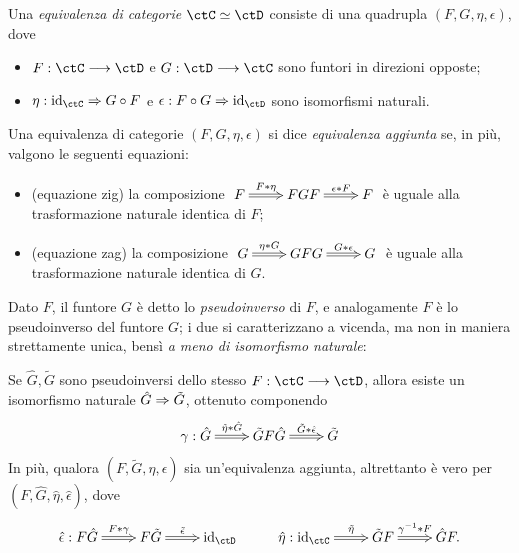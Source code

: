 \begin{definition}\label{funtore_equcat}
	Una \emph{equivalenza di categorie} \(\ctC\simeq\ctD\) consiste di una quadrupla \((F,G,\eta,\epsilon)\), dove
	\begin{itemize}
		\item \(F : \ctC\fun\ctD\) e \(G : \ctD\fun\ctC\) sono funtori in direzioni opposte;
		\item \(\eta : \Id[\ctC] \nat G\cmp F\) e \(\epsilon : F\cmp G \nat \Id[\ctD]\) sono isomorfismi naturali.
	\end{itemize}
	Una equivalenza di categorie \((F,G,\eta,\epsilon)\) si dice \emph{equivalenza aggiunta} se, in più, valgono le seguenti equazioni:
	\begin{itemize}
		\item (equazione zig) la composizione \(\xymatrix{F \ar@{=>}[r]^-{F\whi\eta} & FGF \ar@{=>}[r]^-{\epsilon\whi F} & F}\) è uguale alla trasformazione naturale identica di \(F\);
		\item (equazione zag) la composizione \(\xymatrix{G \ar@{=>}[r]^-{\eta\whi G} & GFG \ar@{=>}[r]^-{G\whi\epsilon} & G}\) è uguale alla trasformazione naturale identica di \(G\).
	\end{itemize}
	Dato \(F\), il funtore \(G\) è detto lo \emph{pseudoinverso} di \(F\), e analogamente \(F\) è lo pseudoinverso del funtore \(G\); i due si caratterizzano a vicenda, ma non in maniera strettamente unica, bensì \emph{a meno di isomorfismo naturale}:
	\begin{lemma}
		Se \(\hat G,\tilde G\) sono pseudoinversi dello stesso \(F : \ctC\fun\ctD\), allora esiste un isomorfismo naturale \(\hat G\Rightarrow \tilde G\), ottenuto componendo
		\[\xymatrix{\gamma : \hat G \ar@{=>}[r]^-{\tilde\eta\whi\hat G } & \tilde G F \hat G \ar@{=>}[r]^-{\tilde G \whi \hat\epsilon} & \tilde G}\]
		In più, qualora \((F, \tilde G,\eta,\epsilon)\) sia un'equivalenza aggiunta, altrettanto è vero per \((F, \hat G,\hat\eta,\hat\epsilon)\), dove
		\[\xymatrix{
			\hat\epsilon : F\hat G \ar@{=>}[r]^-{F\whi \gamma} & F\tilde G \ar@{=>}[r]^-{\tilde\epsilon} & \Id[\ctD] & \hat\eta : \Id[\ctC] \ar@{=>}[r]^-{\tilde\eta} & \tilde GF \ar@{=>}[r]^-{\gamma^{-1}\whi F} & \hat G F.
			}\]
	\end{lemma}
\end{definition}
